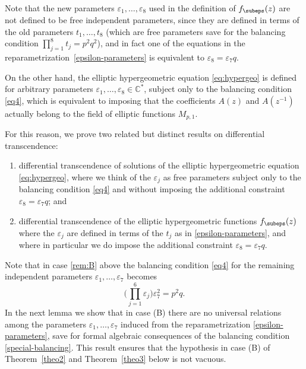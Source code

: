 \begin{remark} Note that the new parameters $\varepsilon_1,\dots,\varepsilon_8$ used in the definition of $f_{\subeps}(z)$ are not defined to be free independent parameters, since they are defined in terms of the old parameters $t_1,\dots,t_8$ (which are free parameters save for the balancing condition $\prod_{j=1}^8 t_j=p^2q^2$), and in fact one of the equations in the reparametrization~\eqref{epsilon-parameters} is equivalent to $\varepsilon_8=\varepsilon_7q$.

On the other hand, the elliptic hypergeometric equation \eqref{eq:hypergeo} is defined for arbitrary parameters $\varepsilon_1,\dots,\varepsilon_8\in\mathbb{C}^{*}$, subject only to the balancing condition \eqref{eq4}, which is equivalent to imposing that the coefficients $A(z)$ and $A(z^{-1})$ actually belong to the field of elliptic functions $M_{p,1}$.

For this reason, we prove two related but distinct results on differential transcendence:
\begin{enumerate}\renewcommand{\theenumi}{\Alph{enumi}}
\item\label{rem:A}
differential transcendence of solutions of the elliptic hypergeometric equation \eqref{eq:hypergeo}, where we think of the $\varepsilon_j$ as free parameters subject only to the balancing condition \eqref{eq4} and without imposing the additional constraint $\varepsilon_8=\varepsilon_7q$; and
\item\label{rem:B}
differential transcendence of the elliptic hypergeometric functions $f_{\subeps}(z)$ where the $\varepsilon_j$ are defined in terms of the $t_j$ as in \eqref{epsilon-parameters}, and where in particular we do impose the additional constraint $\varepsilon_8=\varepsilon_7q$.
\end{enumerate}
\end{remark}

Note that in case \eqref{rem:B} above the balancing condition \eqref{eq4} for the remaining independent parameters $\varepsilon_1,\dots,\varepsilon_7$ becomes \begin{equation}\label{special-balancing} \biggl(\prod_{j=1}^6\varepsilon_j\biggr)\varepsilon_7^2=p^2q.\end{equation} In the next lemma we show that in case (B) there are no universal relations among the parameters $\varepsilon_1,\dots,\varepsilon_7$ induced from the reparametrization \eqref{epsilon-parameters}, save for formal algebraic consequences of the balancing condition \eqref{special-balancing}. This result ensures that the hypothesis in case (B) of Theorem~\ref{theo2} and Theorem~\ref{theo3} below is not vacuous.

